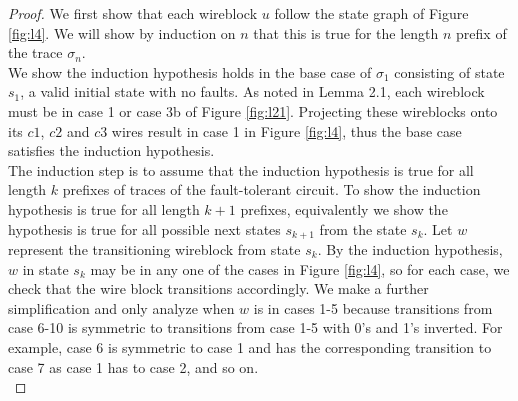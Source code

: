 \documentclass[12pt]{report}
\begin{document}
\begin{proof}
We first show that each wireblock $u$ follow the state graph of Figure \ref{fig:l4}. 
We will show by induction on $n$ that this is true for the length $n$ prefix of the trace $\sigma_n$.\\ %

We show the induction hypothesis holds in the base case of $\sigma_1$ consisting of state $s_1$, a valid initial state with no faults. As noted in Lemma 2.1, each wireblock must be in case 1 or case 3b of Figure \ref{fig:l21}. Projecting these wireblocks onto its $c1$, $c2$ and $c3$ wires result in case 1 in Figure \ref{fig:l4}, thus the base case satisfies the induction hypothesis.\\

The induction step is to assume that the induction hypothesis is true for all length $k$ prefixes of traces of the fault-tolerant circuit. 
To show the induction hypothesis is true for all length $k+1$ prefixes, equivalently we show the hypothesis is true for all possible next states $s_{k+1}$ from the state $s_k$. Let $w$ represent the transitioning wireblock from state $s_k$. By the induction hypothesis, $w$ in state $s_k$ may be in any one of the cases in Figure \ref{fig:l4}, so for each case, we check  that the wire block transitions accordingly. We make a further simplification and only analyze when $w$ is in cases 1-5 because transitions from case 6-10 is symmetric to transitions from case 1-5 with 0's and 1's inverted. For example, case 6 is symmetric to case 1 and has the corresponding transition to case 7 as case 1 has to case 2, and so on.\\


\end{proof}
\end{document}
